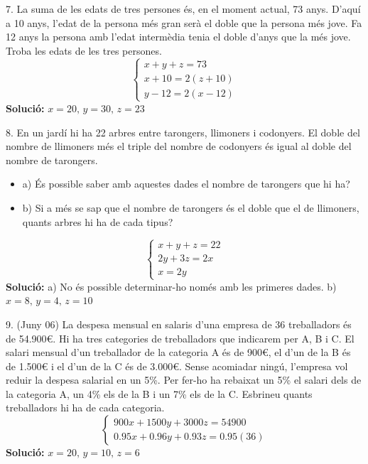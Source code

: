 \documentclass[12pt]{article}
\begin{document}
\begin{exercici}
7. La suma de les edats de tres persones és, en el moment actual, 73 anys. D’aquí a 10 anys, l’edat de la persona més gran serà el doble que la persona més jove. Fa 12 anys la persona amb l’edat intermèdia tenia el doble d’anys que la més jove. Troba les edats de les tres persones.
\[
\begin{cases}
x + y + z = 73 \\
x + 10 = 2(z + 10) \\
y - 12 = 2(x - 12)
\end{cases}
\]
\textbf{Solució:} \( x = 20, \, y = 30, \, z = 23 \)
\end{exercici}

\begin{exercici}
8. En un jardí hi ha 22 arbres entre tarongers, llimoners i codonyers. El doble del nombre de llimoners més el triple del nombre de codonyers és igual al doble del nombre de tarongers.
\begin{itemize}
    \item a) És possible saber amb aquestes dades el nombre de tarongers que hi ha?
    \item b) Si a més se sap que el nombre de tarongers és el doble que el de llimoners, quants arbres hi ha de cada tipus?
\end{itemize}
\[
\begin{cases}
x + y + z = 22 \\
2y + 3z = 2x \\
x = 2y
\end{cases}
\]
\textbf{Solució:} a) No és possible determinar-ho només amb les primeres dades. b) \( x = 8, \, y = 4, \, z = 10 \)
\end{exercici}

\begin{exercici}
9. (Juny 06) La despesa mensual en salaris d’una empresa de 36 treballadors és de 54.900€. Hi ha tres categories de treballadors que indicarem per A, B i C. El salari mensual d’un treballador de la categoria A és de 900€, el d’un de la B és de 1.500€ i el d’un de la C és de 3.000€. Sense acomiadar ningú, l’empresa vol reduir la despesa salarial en un 5\%. Per fer-ho ha rebaixat un 5\% el salari dels de la categoria A, un 4\% els de la B i un 7\% els de la C. Esbrineu quants treballadors hi ha de cada categoria.
\[
\begin{cases}
900x + 1500y + 3000z = 54900 \\
0.95x + 0.96y + 0.93z = 0.95(36)
\end{cases}
\]
\textbf{Solució:} \( x = 20, \, y = 10, \, z = 6 \)
\end{exercici}
\end{document}
